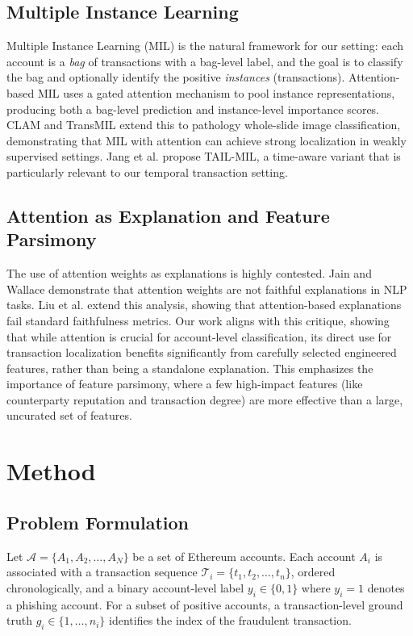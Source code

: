 \documentclass[conference]{IEEEtran}
\begin{document}
\subsection{Multiple Instance Learning}
Multiple Instance Learning (MIL) \cite{mil_survey} is the natural framework for our setting: each account is a \emph{bag} of transactions with a bag-level label, and the goal is to classify the bag and optionally identify the positive \emph{instances} (transactions). Attention-based MIL \cite{ilse2018} uses a gated attention mechanism to pool instance representations, producing both a bag-level prediction and instance-level importance scores. CLAM \cite{clam} and TransMIL \cite{transmil} extend this to pathology whole-slide image classification, demonstrating that MIL with attention can achieve strong localization in weakly supervised settings. Jang et al. \cite{tail_mil} propose TAIL-MIL, a time-aware variant that is particularly relevant to our temporal transaction setting.

\subsection{Attention as Explanation and Feature Parsimony}
The use of attention weights as explanations is highly contested. Jain and Wallace \cite{jain2019} demonstrate that attention weights are not faithful explanations in NLP tasks. Liu et al. \cite{liu2022} extend this analysis, showing that attention-based explanations fail standard faithfulness metrics. Our work aligns with this critique, showing that while attention is crucial for account-level classification, its direct use for transaction localization benefits significantly from carefully selected engineered features, rather than being a standalone explanation. This emphasizes the importance of feature parsimony, where a few high-impact features (like counterparty reputation and transaction degree) are more effective than a large, uncurated set of features.

\section{Method}
\subsection{Problem Formulation}
Let $\mathcal{A} = \{A_1, A_2, \dots, A_N\}$ be a set of Ethereum accounts. Each account $A_i$ is associated with a transaction sequence $\mathcal{T}_i = \{t_1, t_2, \dots, t_n\}$, ordered chronologically, and a binary account-level label $y_i \in \{0, 1\}$ where $y_i=1$ denotes a phishing account. For a subset of positive accounts, a transaction-level ground truth $g_i \in \{1, \dots, n_i\}$ identifies the index of the fraudulent transaction.
\end{document}
